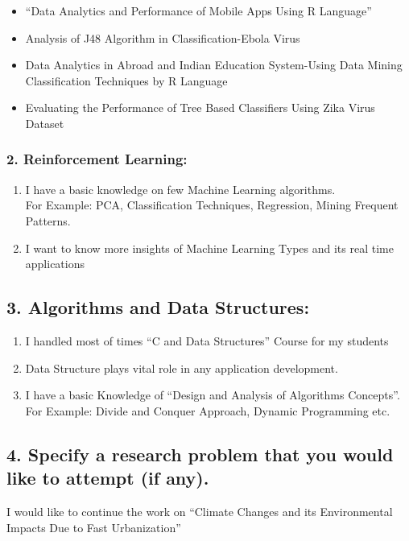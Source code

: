 \documentclass{article}
\begin{document}
\begin{itemize}
\item “Data Analytics and Performance of Mobile Apps Using R Language”
 \item Analysis of J48 Algorithm in Classification-Ebola Virus
 \item Data Analytics in Abroad and Indian Education System-Using Data Mining Classification
Techniques by R Language
\item Evaluating the Performance of Tree Based Classifiers Using Zika Virus Dataset
\end{itemize}
\subsubsection*{2. Reinforcement Learning:}
\begin{enumerate}
 \item I have a basic knowledge on few Machine Learning algorithms.\\
For Example: PCA, Classification Techniques, Regression, Mining Frequent Patterns.
\item I want to know more insights of Machine Learning Types and its real time applications
\end{enumerate}

\subsection*{3. Algorithms and Data Structures:}
\begin{enumerate}
 \item I handled most of times “C and Data Structures” Course for my students
 \item Data Structure plays vital role in any application development.
 \item I have a basic Knowledge of “Design and Analysis of Algorithms Concepts”.\\
For Example: Divide and Conquer Approach, Dynamic Programming etc.
\end{enumerate}

\subsection*{4. Specify a research problem that you would like to attempt (if any).}
\hspace{1cm}
 I would like to continue the work on “Climate Changes and its Environmental Impacts Due to Fast
Urbanization”
\end{document}
